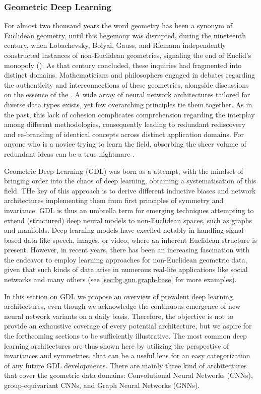 \documentclass[binding=0.6cm]{sapthesis}
\newcommand{\mycite}[1]{(\cite{#1})}
\begin{document}
\subsubsection{Geometric Deep Learning}
\label{sec:bg.gnn.geo-deep-learning}
For almost two thousand years the word geometry has been a synonym of Euclidean geometry, until this hegemony was disrupted, during the nineteenth century, when Lobachevsky, Bolyai, Gauss, and Riemann independently constructed instances of non-Euclidean geometries, signaling the end of Euclid's monopoly \mycite{coxeter1998-non-euclidean-geom}. As that century concluded, these inquiries had fragmented into distinct domains. Mathematicians and philosophers engaged in debates regarding the authenticity and interconnections of these geometries, alongside discussions on the essence of the . A wide array of neural network architectures tailored for diverse data types exists, yet few overarching principles tie them together. As in the past, this lack of cohesion complicates comprehension regarding the interplay among different methodologies, consequently leading to redundant rediscovery and re-branding of identical concepts across distinct application domains. For anyone who is a novice trying to learn the field, absorbing the sheer volume of redundant ideas can be a true nightmare \cite{bronstein2021geometric}.

Geometric Deep Learning (GDL) was born as a  attempt, with the mindset of bringing order into the chaos of deep learning, obtaining a systematisation of this field. THe key of this approach is to derive different inductive biases and network architectures implementing them from first principles of symmetry and invariance. GDL is thus an umbrella term for emerging techniques attempting to extend (structured) deep neural models to non-Euclidean spaces, such as graphs and manifolds. Deep learning models have excelled notably in handling signal-based data like speech, images, or video, where an inherent Euclidean structure is present. However, in recent years, there has been an increasing fascination with the endeavor to employ learning approaches for non-Euclidean geometric data, given that such kinds of data arise in numerous real-life applications like social networks and many others (see \cref{sec:bg.gnn.graph-base} for more examples).

In this section on GDL we propose an overview of prevalent deep learning architectures, even though we acknowledge the continuous emergence of new neural network variants on a daily basis. Therefore, the objective is not to provide an exhaustive coverage of every potential architecture, but we aspire for the forthcoming sections to be sufficiently illustrative. The most common deep learning architectures are thus shown here by utilizing the perspective of invariances and symmetries, that can be a useful lens for an easy categorization of any future GDL developments. There are mainly three kind of architectures that cover the geometric data domains: Convolutional Neural Networks (CNNs), group-equivariant CNNs, and Graph Neural Networks (GNNs). 
\end{document}
